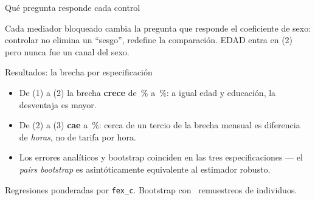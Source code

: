 \documentclass[aspectratio=169]{beamer}
\begin{document}
\begin{frame}{Qué pregunta responde cada control}
\begin{center}
{%
}
\end{center}
\footnotesize Cada mediador bloqueado cambia la pregunta que responde el coeficiente de sexo: controlar no elimina un ``sesgo'', redefine la comparación. EDAD entra en (2) pero nunca fue un canal del sexo.
\end{frame}

\begin{frame}{Resultados: la brecha por especificación}
  \centering
  {\small }

  \vspace{0.8em}
  \begin{itemize}
    \item De (1) a (2) la brecha \textbf{crece} de \GapUncondPct\,\% a
      \GapHKPct\,\%: a igual edad y educación, la desventaja es mayor.
    \item De (2) a (3) \textbf{cae} a \GapHoursPct\,\%: cerca de un tercio de la
      brecha mensual es diferencia de \emph{horas}, no de tarifa por hora.
    \item Los errores analíticos y bootstrap coinciden en las tres
      especificaciones --- el \emph{pairs bootstrap} es asintóticamente
      equivalente al estimador robusto.
  \end{itemize}
  \vspace{0.3em}
  {\footnotesize Regresiones ponderadas por \texttt{fex\_c}. Bootstrap con
  \GapBootReps\ remuestreos de individuos.}
\end{frame}
\end{document}
